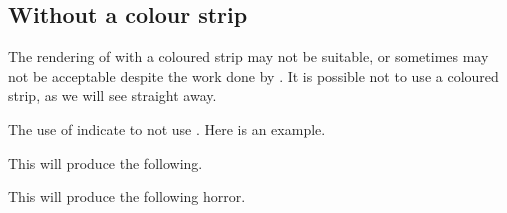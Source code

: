 \documentclass[10pt, a4paper]{tutodoc}
\begin{document}
\subsection{Without a colour strip}

The rendering of  with a coloured strip may not be suitable, or sometimes may not be acceptable despite the work done by .
It is possible not to use a coloured strip, as we will see straight away.


\begin{tdocexa}
    The use of  indicate to not use .
    Here is an example.


    This will produce the following.

    \medskip

    
\end{tdocexa}




\begin{tdocexa}
    \leavevmode


    This will produce the following horror.

    \medskip

    
\end{tdocexa}
\end{document}
